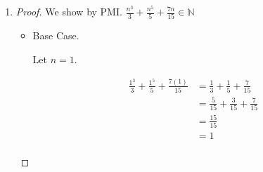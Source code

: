 \documentclass[12pt,letterpaper]{article}
\begin{document}
\begin{enumerate}
\begin{enumerate}
\begin{enumerate}
\begin{proof}
\begin{itemize}
                    Let $n = 1$.

                    \begin{align*}
                      \left(1 + x\right)^1
                      &= 1 + x \\
                      &= 1 + (1)x \\
                      &\geq 1 + (1)x \\
                    \end{align*}
                  \item Inductive Case.

                    Assume for some $n \in \mathbb{N}, \forall x > 0 \in \mathbb{R}, \left(1 + x\right)^n \geq 1 + nx$.

                    Then

                    \begin{align*}
                      \left(1 + x\right)^{n + 1}
                      &= \left(1 + x\right)^n\left(1 + x\right) \\
                      &\geq \left(1 + nx\right)\left(1 + x\right) \\
                      &= 1 + x + nx + nx^2 \\
                      &= 1 + nx + x + nx^2 \\
                      &= 1 + (n + 1)x + nx^2 \\
                      &\geq 1 + (n + 1)x \\
                    \end{align*}

                  \item
                    From the Base case and the inductive case,
                    we use the PMI to state $\forall x > 0 \in \mathbb{R}, \left(1 + x\right)^n \geq 1 + nx, \forall n \in \mathbb{N}$
                \end{itemize}
              \end{proof}
            \item
              \begin{proof}
                We show by PMI.
                $\frac{n^3}{3} + \frac{n^5}{5} + \frac{7n}{15} \in \mathbb{N}$
                \begin{itemize}
                  \item Base Case.

                    Let $n = 1$.

                    \begin{align*}
                      \frac{1^3}{3} + \frac{1^5}{5} + \frac{7\left(1\right)}{15}
                      &= \frac{1}{3} + \frac{1}{5} + \frac{7}{15} \\
                      &= \frac{5}{15} + \frac{3}{15} + \frac{7}{15} \\
                      &= \frac{15}{15} \\
                      &= 1 \\
                    \end{align*}


\end{itemize}
\end{proof}
\end{enumerate}
\end{enumerate}
\end{enumerate}
\end{document}
